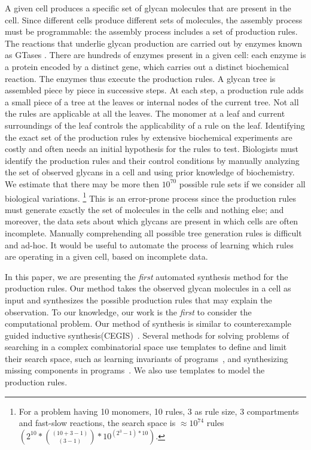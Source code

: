 A given cell produces a specific set of glycan molecules that are present in the cell. Since different cells produce different sets of molecules,
the assembly process must be programmable: the assembly process includes a set of production rules. The reactions that underlie glycan production are carried out by enzymes known as GTases \cite{Varki2017}. There are hundreds of enzymes present in a given cell: each enzyme is a protein encoded by a distinct gene, which carries out a distinct biochemical reaction. The enzymes thus execute the production rules. A glycan tree is assembled piece by piece in successive steps. At each step, a production rule adds a small piece of a tree %
at the leaves or internal nodes of the current tree.
Not all the rules are applicable at all the leaves. The monomer at a leaf and current surroundings of the leaf controls
the applicability of a rule on the leaf.
Identifying the exact set of the production rules by extensive
biochemical experiments are costly and often needs an initial
hypothesis for the rules to test. Biologists must identify the production rules and their control
conditions by manually analyzing the set of observed glycans in a cell
and using prior knowledge of biochemistry.
We estimate that there may be more then $10^{70}$
possible rule sets if we consider all biological variations.
\footnote{For a problem having 10 monomers, 10 rules, 3 as rule size, 3 compartments
and fast-slow reactions, the search space is $\approx 10^{74}$ rules $(2^{10}*{(10+3-1) \choose (3-1)}*10^{(2^3 - 1)*10})$.}
This is an error-prone process since the production rules must generate
exactly the set of molecules in the cells and nothing else; and moreover, the data sets about which glycans are present in which cells are often incomplete. Manually comprehending all possible tree generation rules is difficult and ad-hoc. It would be useful to automate the process of learning which rules are operating in a given cell, based on incomplete data.

In this paper, we are presenting the {\em first} automated synthesis
method for the production rules.
Our method takes the observed glycan molecules in a cell as input and synthesizes
the possible production rules that may explain the observation.
To our knowledge,
our work is the {\em first} to consider the computational problem.
Our method of synthesis is similar to counterexample guided
inductive synthesis(CEGIS)~\cite{cegis}.
Several methods for solving problems of searching in a complex combinatorial
space use templates to define and limit their search space,
such as learning invariants of programs~\cite{InvGenTACAS09},
and synthesizing missing components in programs~\cite{sygus,Solar-Lezama2005}.
We also use templates to model the production rules.

